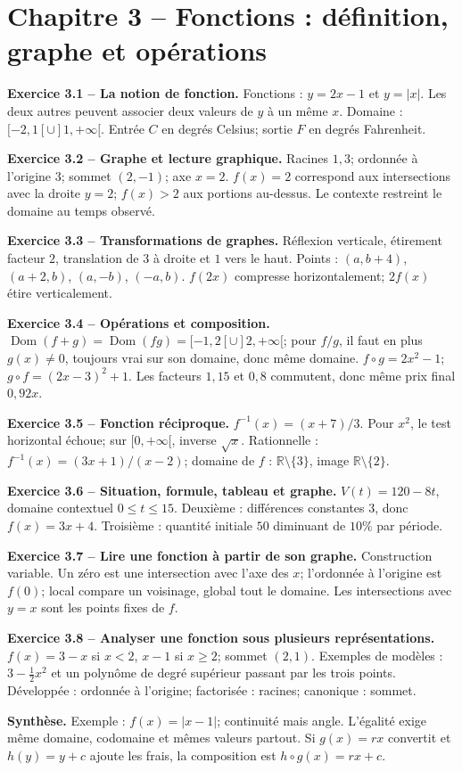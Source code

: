 \documentclass[11pt,a4paper,openany]{book}
\newcommand{\R}{\mathbb{R}}\newcommand{\N}{\mathbb{N}}\newcommand{\Z}{\mathbb{Z}}\newcommand{\Q}{\mathbb{Q}}
\newcommand{\dom}{\operatorname{Dom}}\newcommand{\im}{\operatorname{Im}}\newcommand{\e}{\mathrm e}
\begin{document}
\chapter*{Chapitre 3 -- Fonctions : définition, graphe et opérations}
\begin{answerbox}
\textbf{Exercice 3.1 -- La notion de fonction.} Fonctions : $y=2x-1$ et $y=|x|$. Les deux autres peuvent associer deux valeurs de $y$ à un même $x$. Domaine : $[-2,1[\cup]1,+\infty[$. Entrée $C$ en degrés Celsius; sortie $F$ en degrés Fahrenheit.\par
\textbf{Exercice 3.2 -- Graphe et lecture graphique.} Racines $1,3$; ordonnée à l'origine $3$; sommet $(2,-1)$; axe $x=2$. $f(x)=2$ correspond aux intersections avec la droite $y=2$; $f(x)>2$ aux portions au-dessus. Le contexte restreint le domaine au temps observé.\par
\textbf{Exercice 3.3 -- Transformations de graphes.} Réflexion verticale, étirement facteur $2$, translation de $3$ à droite et $1$ vers le haut. Points : $(a,b+4)$, $(a+2,b)$, $(a,-b)$, $(-a,b)$. $f(2x)$ compresse horizontalement; $2f(x)$ étire verticalement.\par
\textbf{Exercice 3.4 -- Opérations et composition.} $\dom(f+g)=\dom(fg)=[-1,2[\cup]2,+\infty[$; pour $f/g$, il faut en plus $g(x)\neq0$, toujours vrai sur son domaine, donc même domaine. $f\circ g=2x^2-1$; $g\circ f=(2x-3)^2+1$. Les facteurs $1{,}15$ et $0{,}8$ commutent, donc même prix final $0{,}92x$.\par
\textbf{Exercice 3.5 -- Fonction réciproque.} $f^{-1}(x)=(x+7)/3$. Pour $x^2$, le test horizontal échoue; sur $[0,+\infty[$, inverse $\sqrt{x}$. Rationnelle : $f^{-1}(x)=(3x+1)/(x-2)$; domaine de $f$ : $\R\setminus\{3\}$, image $\R\setminus\{2\}$.\par
\textbf{Exercice 3.6 -- Situation, formule, tableau et graphe.} $V(t)=120-8t$, domaine contextuel $0\le t\le15$. Deuxième : différences constantes $3$, donc $f(x)=3x+4$. Troisième : quantité initiale $50$ diminuant de $10\%$ par période.\par
\textbf{Exercice 3.7 -- Lire une fonction à partir de son graphe.} Construction variable. Un zéro est une intersection avec l'axe des $x$; l'ordonnée à l'origine est $f(0)$; local compare un voisinage, global tout le domaine. Les intersections avec $y=x$ sont les points fixes de $f$.\par
\textbf{Exercice 3.8 -- Analyser une fonction sous plusieurs représentations.} $f(x)=3-x$ si $x<2$, $x-1$ si $x\ge2$; sommet $(2,1)$. Exemples de modèles : $3-\frac12x^2$ et un polynôme de degré supérieur passant par les trois points. Développée : ordonnée à l'origine; factorisée : racines; canonique : sommet.\par
\medskip\textbf{Synthèse.} Exemple : $f(x)=|x-1|$; continuité mais angle. L'égalité exige même domaine, codomaine et mêmes valeurs partout. Si $g(x)=rx$ convertit et $h(y)=y+c$ ajoute les frais, la composition est $h\circ g(x)=rx+c$.
\end{answerbox}
\end{document}
